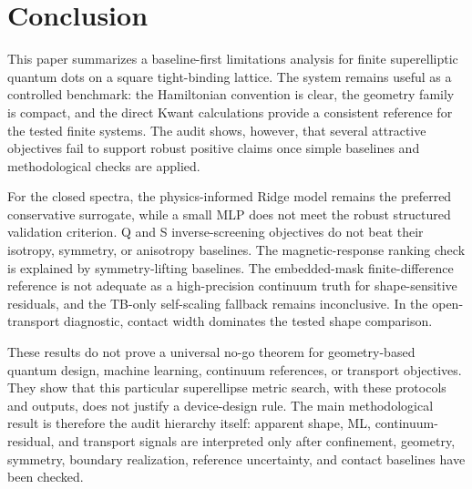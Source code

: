 \section{Conclusion}

This paper summarizes a baseline-first limitations analysis for finite
superelliptic quantum dots on a square tight-binding lattice. The system remains
useful as a controlled benchmark: the Hamiltonian convention is clear, the
geometry family is compact, and the direct Kwant calculations provide a
consistent reference for the tested finite systems. The audit shows, however,
that several attractive objectives fail to support robust positive claims once
simple baselines and methodological checks are applied.

For the closed spectra, the physics-informed Ridge model remains the preferred
conservative surrogate, while a small MLP does not meet the robust structured
validation criterion. Q and S inverse-screening objectives do not beat their
isotropy, symmetry, or anisotropy baselines. The magnetic-response ranking
check is explained by symmetry-lifting baselines. The embedded-mask
finite-difference reference is not adequate as a high-precision continuum truth
for shape-sensitive residuals, and the TB-only self-scaling fallback remains
inconclusive. In the open-transport diagnostic, contact width dominates the
tested shape comparison.

These results do not prove a universal no-go theorem for geometry-based quantum
design, machine learning, continuum references, or transport objectives. They
show that this particular superellipse metric search, with these protocols and
outputs, does not justify a device-design rule. The main methodological result
is therefore the audit hierarchy itself: apparent shape, ML, continuum-residual,
and transport signals are interpreted only after confinement, geometry,
symmetry, boundary realization, reference uncertainty, and contact baselines
have been checked.
